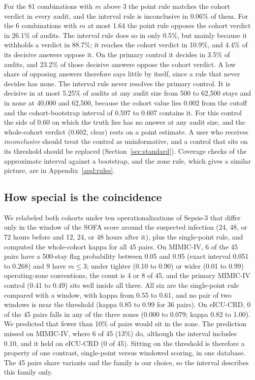 \documentclass[10pt]{article}
\theoremstyle{definition}
\begin{document}
For the 81 combinations with $m$ above 3 the point rule matches the cohort verdict in every audit, and the interval rule is inconclusive in 0.06\% of them. For the 6 combinations with $m$ at most 1.64 the point rule opposes the cohort verdict in 26.1\% of audits. The interval rule does so in only 0.5\%, but mainly because it withholds a verdict in 88.7\%; it reaches the cohort verdict in 10.9\%, and 4.4\% of its decisive answers oppose it. On the primary control it decides in 3.5\% of audits, and 23.2\% of those decisive answers oppose the cohort verdict. A low share of opposing answers therefore says little by itself, since a rule that never decides has none. The interval rule never resolves the primary control. It is decisive in at most 5.25\% of audits at any audit size from 500 to 62,500 stays and in none at 40,000 and 62,500, because the cohort value lies 0.002 from the cutoff and the cohort-bootstrap interval of 0.597 to 0.607 contains it. For this control the side of 0.60 on which the truth lies has no answer at any audit size, and the whole-cohort verdict (0.602, clear) rests on a point estimate. A user who receives \emph{inconclusive} should treat the control as uninformative, and a control that sits on its threshold should be replaced (Section~\ref{sec:standard}). Coverage checks of the approximate interval against a bootstrap, and the zone rule, which gives a similar picture, are in Appendix~\ref{apd:rules}.

\subsection{How special is the coincidence}

We relabeled both cohorts under ten operationalizations of Sepsis-3 that differ only in the window of the SOFA score around the suspected infection (24, 48, or 72 hours before and 12, 24, or 48 hours after it), plus the single-point rule, and computed the whole-cohort kappa for all 45 pairs. On MIMIC-IV, 6 of the 45 pairs have a 500-stay flag probability between 0.05 and 0.95 (exact interval 0.051 to 0.268) and 9 have $m\le 3$; under tighter (0.10 to 0.90) or wider (0.01 to 0.99) operating-zone conventions, the count is 4 or 8 of 45, and the primary MIMIC-IV control (0.41 to 0.49) sits well inside all three. All six are the single-point rule compared with a window, with kappa from 0.55 to 0.61, and no pair of two windows is near the threshold (kappa 0.85 to 0.99 for 36 pairs). On eICU-CRD, 0 of the 45 pairs falls in any of the three zones (0.000 to 0.079; kappa 0.82 to 1.00). We predicted that fewer than 10\% of pairs would sit in the zone. The prediction missed on MIMIC-IV, where 6 of 45 (13\%) do, although the interval includes 0.10, and it held on eICU-CRD (0 of 45). Sitting on the threshold is therefore a property of one contrast, single-point versus windowed scoring, in one database. The 45 pairs share variants and the family is our choice, so the interval describes this family only.
\end{document}
